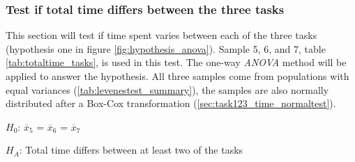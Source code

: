 \subsubsection[Sample 5, 6 and 7]{Test if total time differs between the three tasks}\label{sec:anova_result} %
This section will test if time spent varies between each of the three tasks (hypothesis one in figure \ref{fig:hypothesis_anova}). Sample 5, 6, and 7, table \ref{tab:totaltime_tasks}, is used in this test. The one-way \textit{ANOVA} method will be applied to answer the hypothesis. All three samples come from populations with equal variances (\ref{tab:levenestest_summary}), the samples are also normally distributed after a Box-Cox transformation (\ref{sec:task123_time_normaltest}).\\

\centerline{$H_{0}$: $\overline{x}_5$ = $\overline{x}_6$ = $\overline{x}_7$}
\centerline{$H_{A}$: Total time differs between at least two of the tasks}

